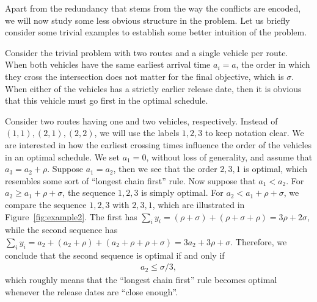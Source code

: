 \documentclass[a4paper]{article}
\theoremstyle{definition}
\theoremstyle{plain}
\begin{document}

Apart from the redundancy that stems from the way the conflicts are encoded, we
will now study some less obvious structure in the problem.
%
Let us briefly consider some trivial examples to establish some better intuition
of the problem.

\begin{eg}
  Consider the trivial problem with two routes and a single vehicle per route.
  When both vehicles have the same earliest arrival time $a_{i} = a$, the order
  in which they cross the intersection does not matter for the final objective,
  which is $\sigma$. When either of the vehicles has a strictly earlier release
  date, then it is obvious that this vehicle must go first in the optimal
  schedule.
\end{eg}
%
\begin{eg}
  \label{example2}
  Consider two routes having one and two vehicles, respectively. Instead of
  $(1,1), (2,1), (2,2)$, we will use the labels $1, 2, 3$ to keep notation
  clear. We are interested in how the earliest crossing times influence the
  order of the vehicles in an optimal schedule. We set $a_{1} = 0$, without loss
  of generality, and assume that $a_{3} = a_{2} + \rho$. Suppose
  $a_{1} = a_{2}$, then we see that the order $2, 3, 1$ is optimal, which
  resembles some sort of ``longest chain first'' rule. Now suppose that
  $a_{1} < a_{2}$. For $a_{2} \geq a_{1} + \rho + \sigma$, the sequence
  $1, 2, 3$ is simply optimal. For $a_{2} < a_{1} + \rho + \sigma$, we compare
  the sequence $1, 2, 3$ with $2, 3, 1$, which are illustrated in
  Figure~\ref{fig:example2}. The first has
  $\sum_{i} y_{i} = (\rho+\sigma) + (\rho+\sigma+\rho) = 3\rho + 2\sigma$,
  while the second sequence has
  $\sum_{i} y_{i} = a_{2} + (a_{2} + \rho) + (a_{2} + \rho + \rho + \sigma) = 3 a_{2} + 3\rho + \sigma$.
  Therefore, we conclude that the second sequence is optimal if and only if
  \begin{align}
    \label{eq:before-condition}
    a_{2} \leq \sigma/3 ,
  \end{align}
  which roughly means that the ``longest chain first'' rule becomes optimal
  whenever the release dates are ``close enough''.
\end{eg}
%
\end{document}
